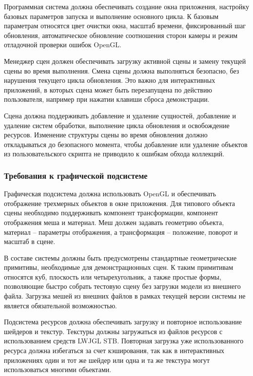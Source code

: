 Программная система должна обеспечивать создание окна приложения, настройку базовых параметров запуска и выполнение основного цикла. К базовым параметрам относятся цвет очистки окна, масштаб времени, фиксированный шаг обновления, автоматическое обновление соотношения сторон камеры и режим отладочной проверки ошибок OpenGL.

Менеджер сцен должен обеспечивать загрузку активной сцены и замену текущей сцены во время выполнения. Смена сцены должна выполняться безопасно, без нарушения текущего цикла обновления. Это важно для интерактивных приложений, в которых сцена может быть перезапущена по действию пользователя, например при нажатии клавиши сброса демонстрации.

Сцена должна поддерживать добавление и удаление сущностей, добавление и удаление систем обработки, выполнение цикла обновления и освобождение ресурсов. Изменение структуры сцены во время обновления должно откладываться до безопасного момента, чтобы добавление или удаление объектов из пользовательского скрипта не приводило к ошибкам обхода коллекций.

\subsubsection{Требования к графической подсистеме}

Графическая подсистема должна использовать OpenGL и обеспечивать отображение трехмерных объектов в окне приложения. Для типового объекта сцены необходимо поддерживать компонент трансформации, компонент отображения меша и материал. Меш должен задавать геометрию объекта, материал -- параметры отображения, а трансформация -- положение, поворот и масштаб в сцене.

В составе системы должны быть предусмотрены стандартные геометрические примитивы, необходимые для демонстрационных сцен. К таким примитивам относятся куб, плоскость или четырехугольник, а также простые формы, позволяющие быстро собрать тестовую сцену без загрузки модели из внешнего файла. Загрузка мешей из внешних файлов в рамках текущей версии системы не является обязательной возможностью.

Подсистема ресурсов должна обеспечивать загрузку и повторное использование шейдеров и текстур. Текстуры должны загружаться из файлов ресурсов с использованием средств LWJGL STB. Повторная загрузка уже использованного ресурса должна избегаться за счет кэширования, так как в интерактивных приложениях один и тот же шейдер или одна и та же текстура могут использоваться многими объектами.

